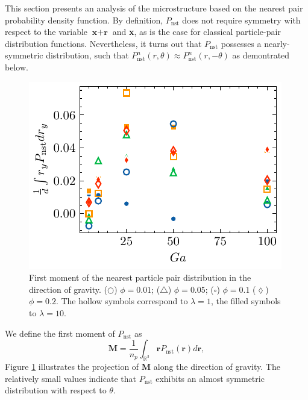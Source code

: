 This section presents an analysis of the microstructure based on the nearest pair probability density function. %
By definition, $P_\text{nst}$ does not require symmetry with respect to the variable $\textbf{x}+\textbf{r}$ and \textbf{x}, as is the case for classical particle-pair distribution functions. 
Nevertheless, it turns out that $P_\text{nst}$ possesses a nearly-symmetric distribution, such that  $P_\text{nst}^n(r,\theta)\approx P_\text{nst}^n(r,- \theta)$ as demontrated below.
\begin{figure}[h!]
    \centering
    \includegraphics[height = 0.3\textwidth]{image/HOMOGENEOUS_NEW/PA/R.pdf}
    \caption{ First moment of the nearest particle pair distribution in the direction of gravity. 
    ($\pmb\bigcirc$) $\phi = 0.01$; ($\pmb\triangle$) $ \phi = 0.05$; ($\pmb\square$) $\phi = 0.1$ ($\pmb\lozenge$) $\phi = 0.2$.
    The hollow symbols correspond to $\lambda = 1$, the filled symbols to $\lambda = 10$.
    }
    \label{fig:ap:RY}
\end{figure}
We define the first moment of $P_\text{nst}$ as
\begin{equation}
 \textbf{M} = \frac{1}{n_p}\int_{\mathbb{R}^3} \textbf{r} P_\text{nst}(\textbf{r}) d\textbf{r},
\end{equation}
Figure \ref{fig:ap:RY} illustrates the projection of $\textbf{M}$ along the direction of gravity. The relatively small values indicate that $P_\text{nst}$ exhibits an almost symmetric distribution with respect to $\theta$.
